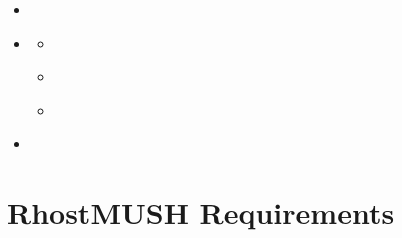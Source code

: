\documentclass[letterpaper,10pt,english]{sphinxmanual}
\begin{document}
\begin{sphinxShadowBox}
\begin{itemize}
\begin{itemize}
\end{itemize}

\item {} 
\sphinxAtStartPar
{}\label{\detokenize{install:id45}}{\hyperref[\detokenize{install:customtize-the-textfiles-for-your-game}]{}}

\item {} 
\sphinxAtStartPar
{}\label{\detokenize{install:id46}}{\hyperref[\detokenize{install:three-options-for-starting-a-mush}]{}}
\begin{itemize}
\item {} 
\sphinxAtStartPar
{}\label{\detokenize{install:id47}}{\hyperref[\detokenize{install:option-1-creating-a-new-game-with-a-blank-database}]{}}

\item {} 
\sphinxAtStartPar
{}\label{\detokenize{install:id48}}{\hyperref[\detokenize{install:options-2-creating-a-new-game-with-ambrosia-s-default-database}]{}}

\item {} 
\sphinxAtStartPar
{}\label{\detokenize{install:id49}}{\hyperref[\detokenize{install:option-3-creating-a-new-game-with-the-generic-default-database}]{}}

\end{itemize}

\item {} 
\sphinxAtStartPar
{}\label{\detokenize{install:id50}}{\hyperref[\detokenize{install:starting-your-mush}]{}}

\end{itemize}
\end{sphinxShadowBox}


\section{RhostMUSH Requirements}
\label{\detokenize{install:rhostmush-requirements}}\label{\detokenize{install:id2}}
\end{document}
